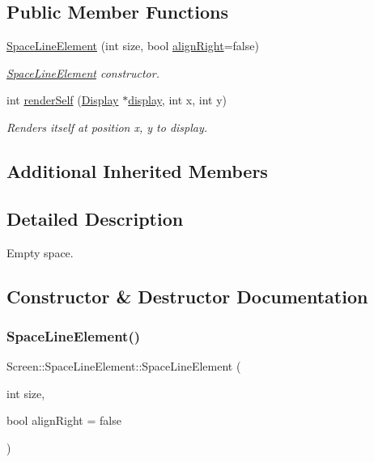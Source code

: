 \subsection*{Public Member Functions}
\begin{DoxyCompactItemize}
\item 
\mbox{\hyperlink{classScreen_1_1SpaceLineElement_a5049df7e0470c0c6b2da96cbb3be2e31}{Space\+Line\+Element}} (int size, bool \mbox{\hyperlink{classScreen_1_1LineElement_a0c5f4e33c2df1dce8e4e45b90dac1423}{align\+Right}}=false)
\begin{DoxyCompactList}\small\item\em \mbox{\hyperlink{classScreen_1_1SpaceLineElement}{Space\+Line\+Element}} constructor. \end{DoxyCompactList}\item 
int \mbox{\hyperlink{classScreen_1_1SpaceLineElement_a897336996ddbfbb7c86bb6ef9acb8536}{render\+Self}} (\mbox{\hyperlink{classDisplay}{Display}} $\ast$\mbox{\hyperlink{classScreen_aad713267725e8aa8a8def951a07de641}{display}}, int x, int y)
\begin{DoxyCompactList}\small\item\em Renders itself at position x, y to display. \end{DoxyCompactList}\end{DoxyCompactItemize}
\subsection*{Additional Inherited Members}


\subsection{Detailed Description}
Empty space. 

\subsection{Constructor \& Destructor Documentation}
\mbox{\label{classScreen_1_1SpaceLineElement_a5049df7e0470c0c6b2da96cbb3be2e31}} 
\subsubsection{\texorpdfstring{Space\+Line\+Element()}{SpaceLineElement()}}
{\footnotesize\ttfamily Screen\+::\+Space\+Line\+Element\+::\+Space\+Line\+Element (\begin{DoxyParamCaption}\item[{int}]{size,  }\item[{bool}]{align\+Right = {\ttfamily false} }\end{DoxyParamCaption})}



